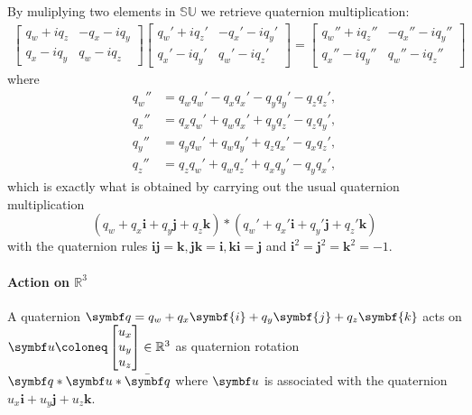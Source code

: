 By muliplying two elements in $\mathbb{SU}$ we retrieve quaternion multiplication:
\begin{equation}
  \begin{aligned}
    \begin{bmatrix}
      q_w + i q_z & -q_x - i q_y \\
      q_x - i q_y & q_w - i q_z
    \end{bmatrix} \begin{bmatrix}
      q_w' + i q_z' & -q_x' - i q_y' \\
      q_x' - i q_y' & q_w' - i q_z'
    \end{bmatrix}
    = \begin{bmatrix}
      q_w'' + i q_z'' & -q_x'' - i q_y'' \\
      q_x'' - i q_y'' & q_w'' - i q_z''
    \end{bmatrix}
  \end{aligned}
\end{equation}
where
\begin{equation}
  \label{eq:quaternion_composition}
  \begin{aligned}
    q_w'' & = q_w q_w' - q_x q_x' - q_y q_y' - q_z q_z',  \\
    q_x'' & = q_x q_w' + q_w q_x' + q_y q_z' - q_z q_y', \\
    q_y'' & = q_y q_w' + q_w q_y' + q_z q_x' - q_x q_z',  \\
    q_z'' & = q_z q_w' + q_w q_z' + q_x q_y' - q_y q_x',
  \end{aligned}
\end{equation}
which is exactly what is obtained by carrying out the usual quaternion multiplication
\begin{equation}
  (q_w + q_x \symbf{i} + q_y \symbf{j} + q_z \symbf{k}) * (q_w' + q_x' \symbf{i} + q_y' \symbf{j} + q_z' \symbf{k})
\end{equation}
with the quaternion rules $\symbf{i}\symbf{j} = \symbf{k}, \symbf{j}\symbf{k} = \symbf{i}, \symbf{k}\symbf{i} = \symbf{j}$ and $\symbf{i}^2 = \symbf{j}^2 = \symbf{k}^2 = -1$.

\paragraph{Action on \texorpdfstring{$\mathbb{R}^3$}{R3}}

A quaternion $\bq = q_w + q_x \symbf{i} + q_y \symbf{j} + q_z \symbf{k}$ acts on $\bu \coloneq \begin{bmatrix} u_x \\ u_y \\ u_z \end{bmatrix} \in \mathbb{R}^3$ as quaternion rotation $\bq * \bu * \bar {\bq}$ where $\bu$ is associated with the quaternion $u_x \symbf{i} + u_y \symbf{j} + u_z \symbf{k}$.

